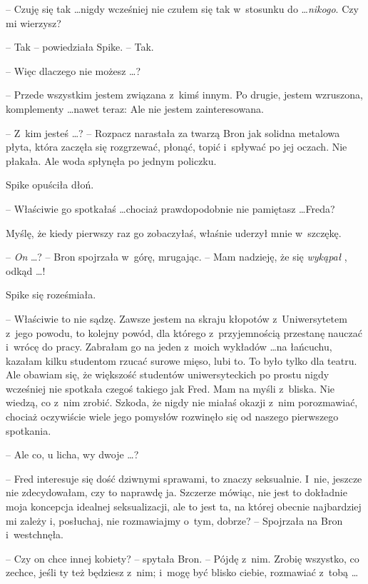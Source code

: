 \documentclass[oneside,polish,11pt,rmheadings]{mwbk}
\begin{document}
-- Czuję się tak \ldots   nigdy wcześniej nie czułem się tak w~stosunku do \ldots  \textit{nikogo}. Czy mi wierzysz? 

-- Tak -- powiedziała Spike. -- Tak. 

-- Więc dlaczego nie możesz \ldots ? 

-- Przede wszystkim jestem związana z~kimś innym. Po drugie, jestem wzruszona, komplementy \ldots  nawet teraz: Ale nie jestem zainteresowana.  

-- Z~kim jesteś  \ldots  ? -- Rozpacz narastała za twarzą Bron jak solidna metalowa płyta, która zaczęła się rozgrzewać, płonąć, topić i~spływać po jej oczach. Nie płakała. Ale woda spłynęła po jednym policzku. 

Spike opuściła dłoń. 

-- Właściwie go spotkałaś \ldots  chociaż prawdopodobnie nie pamiętasz \ldots  Freda? 

Myślę, że kiedy pierwszy raz go zobaczyłaś, właśnie uderzył mnie w~szczękę. 

-- \textit{On } \ldots ? --  Bron spojrzała w~górę, mrugając. -- Mam nadzieję, że się \textit{wykąpał }, odkąd \ldots ! 

Spike się roześmiała. 

-- Właściwie to nie sądzę. Zawsze jestem na skraju kłopotów z~Uniwersytetem z~jego powodu, to kolejny powód, dla którego z~przyjemnością przestanę nauczać i~wrócę do pracy. Zabrałam go na jeden z~moich wykładów \ldots   na łańcuchu, kazałam kilku studentom rzucać surowe mięso, lubi to. To było tylko dla teatru. Ale obawiam się, że większość studentów uniwersyteckich po prostu nigdy wcześniej nie spotkała czegoś takiego jak Fred. Mam na myśli z~bliska. Nie wiedzą, co z~nim zrobić. Szkoda, że nigdy nie miałaś okazji z~nim porozmawiać, chociaż oczywiście wiele jego pomysłów rozwinęło się od naszego pierwszego spotkania. 

-- Ale co, u licha, wy dwoje \ldots ? 

-- Fred interesuje się dość dziwnymi sprawami, to znaczy seksualnie. I~nie, jeszcze nie zdecydowałam, czy to naprawdę ja. Szczerze mówiąc, nie jest to dokładnie moja koncepcja idealnej seksualizacji, ale to jest ta, na której obecnie najbardziej mi zależy i, posłuchaj, nie rozmawiajmy o~tym, dobrze? --  Spojrzała na Bron i~westchnęła. 

-- Czy on chce innej kobiety? --  spytała Bron. -- Pójdę z~nim. Zrobię wszystko, co zechce, jeśli ty też będziesz z~nim; i~mogę być blisko ciebie, rozmawiać z~tobą \ldots  
\end{document}
